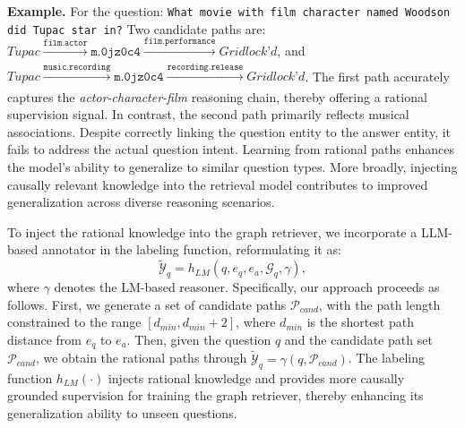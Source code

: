 \documentclass{article}
\theoremstyle{plain}
\theoremstyle{definition}
\theoremstyle{remark}
\newcommand{\ti}[1]{\textit{#1}}
\newcommand{\tb}[1]{\textbf{#1}}
\newcommand{\mcal}[1]{\mathcal{#1}}
\begin{document}
\tb{Example.} For the question: \texttt{What movie with film character named Woodson did Tupac star in?} Two candidate paths are: 
$\textit{Tupac}  \xrightarrow[]{\texttt{film.actor}} \texttt{m.0jz0c4} \xrightarrow[]{\texttt{film.performance}} \textit{Gridlock’d}$, and  
$\textit{Tupac}  \xrightarrow[]{\texttt{music.recording}} \texttt{m.0jz0c4} \xrightarrow[]{\texttt{recording.release}} \textit{Gridlock’d}$.
The first path accurately captures the \ti{actor-character-film} reasoning chain, thereby offering a rational supervision signal. In contrast, the second path primarily reflects musical associations. Despite correctly linking the question entity to the answer entity, it fails to address the actual question intent. Learning from rational paths enhances the model’s ability to generalize to similar question types. More broadly, injecting causally relevant knowledge into the retrieval model contributes to improved generalization across diverse reasoning scenarios.

To inject the rational knowledge into the graph retriever, we incorporate a LLM-based annotator in the labeling function, reformulating it as:
\begin{equation}
\widetilde{\mcal{Y}}_q = h_{LM}(q, e_q, e_a, \mcal{G}_q, \gamma),
\end{equation}
where $\gamma$ denotes the LM-based reasoner. Specifically, our approach proceeds as follows. First, we generate a set of candidate paths $\mcal{P}_{cand}$, with the path length constrained to the range $[d_{min}, d_{min}+2]$, where $d_{min}$ is the shortest path distance from $e_q$ to $e_a$. Then, given the question $q$ and the candidate path set $\mcal{P}_{cand}$, we obtain the rational paths through $\widetilde{\mcal{Y}}_q = \gamma(q, \mcal{P}_{cand})$.
The labeling function $h_{LM}(\cdot)$ injects rational knowledge and provides more causally grounded supervision for training the graph retriever, thereby enhancing its generalization ability to unseen questions.
\end{document}

